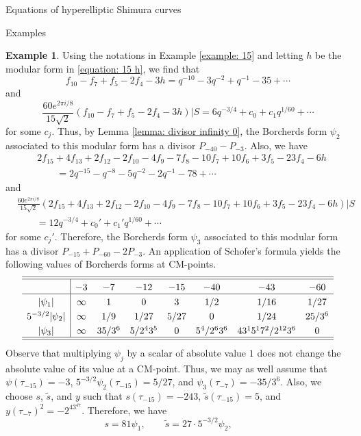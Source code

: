 \documentclass{amsart}
\newcounter{lemma}
\theoremstyle{definition}
\newtheorem{Example}[lemma]{Example}
\def\wt{\widetilde}
\begin{document}
\begin{section}{Equations of hyperelliptic Shimura curves}
\begin{subsection}{Examples}
\begin{Example}
  Using the notations in Example \ref{example: 15} and letting $h$ be
  the modular form in \eqref{equation: 15 h}, we find that
  $$
    f_{10}-f_7+f_5-2f_4-3h=q^{-10}-3q^{-2}+q^{-1}-35+\cdots
  $$
  and
  $$
    \frac{60e^{2\pi i/8}}{15\sqrt 2}(f_{10}-f_7+f_5-2f_4-3h)|S
   =6q^{-3/4}+c_0+c_1q^{1/60}+\cdots
  $$
  for some $c_j$. Thus, by Lemma \ref{lemma: divisor infinity 0}, the
  Borcherds form $\psi_2$ associated to this modular form has a divisor
  $P_{-40}-P_{-3}$. Also, we have
  \begin{equation*}
  \begin{split}
  &2f_{15}+4f_{13}+2f_{12}-2f_{10}-4f_9-7f_8-10f_7+10f_6+3f_5-23f_4-6h \\
  &\qquad=2q^{-15}-q^{-8}-5q^{-2}-2q^{-1}-78+\cdots
  \end{split}
  \end{equation*}
  and
  \begin{equation*}
  \begin{split}
  &\frac{60e^{2\pi i/8}}{15\sqrt 2}
   (2f_{15}+4f_{13}+2f_{12}-2f_{10}-4f_9-7f_8-10f_7+10f_6+3f_5-23f_4-6h)|S \\
  &\qquad=12q^{-3/4}+c_0'+c_1'q^{1/60}+\cdots
  \end{split}
  \end{equation*}
  for some $c_j'$. Therefore, the Borcherds form $\psi_3$ associated
  to this modular form has a divisor $P_{-15}+P_{-60}-2P_{-3}$. An
  application of Schofer's formula yields the following values of
  Borcherds forms at CM-points.
  $$ \extrarowheight3pt
  \begin{array}{c|ccccccc} \hline\hline
    & -3 & -7 & -12 & -15 & -40 & -43 & -60 \\ \hline
  |\psi_1| & \infty & 1 & 0 & 3 & 1/2 & 1/16 & 1/27 \\
  5^{-3/2}|\psi_2| & \infty & 1/9 & 1/27 & 5/27 & 0 & 1/24 & 25/3^6 \\
  |\psi_3| & \infty & 35/3^6 & 5/2^43^5 & 0 & 5^4/2^63^6 &
           43^15^17^2/2^{12}3^6 & 0\\
  \hline \hline
  \end{array}
  $$
  Observe that multiplying $\psi_j$ by a scalar of absolute value $1$
  does not change the absolute value of its value at a CM-point. Thus,
  we may as well assume that $\psi(\tau_{-15})=-3$,
  $5^{-3/2}\psi_2(\tau_{-15})=5/27$, and
  $\psi_3(\tau_{-7})=-35/3^6$. Also, we choose $s$, $\wt s$, and $y$
  such that $s(\tau_{-15})=-243$, $\wt s(\tau_{-15})=5$, and
  $y(\tau_{-7})^2=-2^43^47$. Therefore,
  we have
  $$
    s=81\psi_1, \qquad\wt s=27\cdot5^{-3/2}\psi_2, \qquad
$$
\end{Example}
\end{subsection}
\end{section}
\end{document}
